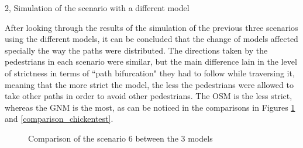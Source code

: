 \documentclass[10pt,a4paper]{article}
\begin{document}
\begin{task}{2, Simulation of the scenario with a different model}
\begin{enumerate}[label=(\alph*)]
\end{enumerate}
    

\bigskip


After looking through the results of the simulation of the previous three scenarios using the different models, it can be concluded that the change of models affected specially the way the paths were distributed. The directions taken by the pedestrians in each scenario were similar, but the main difference lain in the level of strictness in terms of ``path bifurcation" they had to follow while traversing it, meaning that the more strict the model, the less the pedestrians were allowed to take other paths in order to avoid other pedestrians. The OSM is the less strict, whereas the GNM is the most, as can be noticed in the comparisons in Figures \ref{comparison_scenario6} and \ref{comparison_chickentest}.

    \begin{figure} [H]
    \centering
        \caption{Comparison of the scenario 6 between the 3 models}
        \label{comparison_scenario6}
    \end{figure}


\end{task}
\end{document}
